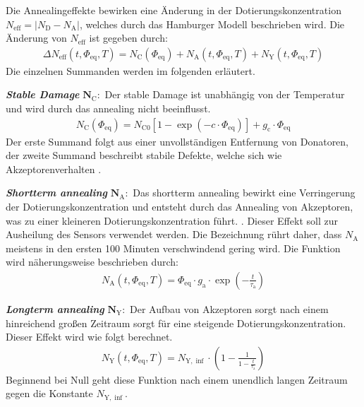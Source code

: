 Die Annealingeffekte bewirken eine Änderung in der Dotierungskonzentration $N_{\mathrm{eff}}= |N_{\mathrm{D}}-N_{\mathrm{A}}|$, welches durch das Hamburger Modell beschrieben wird.
Die Änderung von $N_{\mathrm{eff}}$ ist gegeben durch:
\begin{align}
  \Delta N_{\mathrm{eff}}(t, \Phi_{\mathrm{eq}}, T)   = N_{\mathrm{C}}(\Phi_{\mathrm{eq}}) + N_{\mathrm{A}}(t, \Phi_{\mathrm{eq}}, T) + N_{\mathrm{Y}}(t, \Phi_{\mathrm{eq}}, T) \label{eqn:N_eff}
\end{align}
Die einzelnen Summanden werden im folgenden erläutert.

\textbf{\textit{Stable Damage}} $\symbf{N_{\mathrm{C}}}:$ Der stable Damage ist unabhängig von der Temperatur und wird durch das annealing nicht beeinflusst.
\begin{align}
  N_{\mathrm{C}}(\Phi_{\mathrm{eq}}) = N_{\mathrm{C0}}[1-\exp{(-c \cdot \Phi_{\mathrm{eq}})}] + g_{\mathrm{c}} \cdot \Phi_{\mathrm{eq}}
\end{align}
Der erste Summand folgt aus einer unvollständigen Entfernung von Donatoren, der zweite Summand beschreibt stabile Defekte, welche sich wie Akzeptorenverhalten \cite{beyer}.


\textbf{\textit{Shortterm annealing}} $\symbf{N_{\mathrm{A}}}:$ Das shortterm annealing bewirkt eine Verringerung der Dotierungskonzentration und entsteht durch
das Annealing von Akzeptoren, was zu einer kleineren Dotierungskonzentration führt. . Dieser Effekt soll
zur Ausheilung des Sensors verwendet werden. Die Bezeichnung rührt daher, dass $N_{\mathrm{A}}$ meistens in den ersten 100 Minuten verschwindend gering wird. Die
Funktion wird näherungsweise beschrieben durch:
\begin{align}
  N_{\mathrm{A}}(t, \Phi_{\mathrm{eq}}, T) = \Phi_{\mathrm{eq}} \cdot g_{\mathrm{a}} \cdot \exp{\left(-\frac{t}{\tau_{\mathrm{a}}}\right)}
\end{align}


\textbf{\textit{Longterm annealing}} $\symbf{N_{\mathrm{Y}}}:$ Der Aufbau von
Akzeptoren sorgt nach einem hinreichend großen Zeitraum sorgt für eine steigende
Dotierungskonzentration. Dieser Effekt wird wie folgt berechnet.
\begin{align}
  N_{\mathrm{Y}}(t, \Phi_{\mathrm{eq}}, T)     = N_{\mathrm{Y , \inf}}\cdot \left(1 - \frac{1}{1 - \frac{t}{\tau_{\mathrm{a}}}}\right)
\end{align}
Beginnend bei Null geht diese Funktion nach einem unendlich langen Zeitraum gegen die Konstante $N_{\mathrm{Y, \inf}}$.

